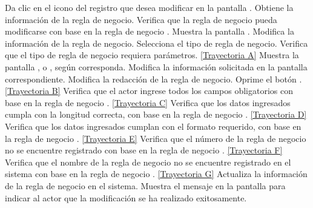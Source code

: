 	\begin{UCtrayectoria}
		\UCpaso[\UCactor] Da clic en el icono \editar del registro que desea modificar en la pantalla .
		\UCpaso[\UCsist] Obtiene la información de la regla de negocio.
		\UCpaso[\UCsist] Verifica que la regla de negocio pueda modificarse con base en la regla de negocio . 
		\UCpaso[\UCsist] Muestra la pantalla .
		\UCpaso[\UCactor] Modifica la información de la regla de negocio. \label{CU8.2-P5}
		\UCpaso[\UCactor] Selecciona el tipo de regla de negocio.
		\UCpaso[\UCsist] Verifica que el tipo de regla de negocio requiera parámetros. \hyperlink{CU8-2:TAA}{[Trayectoria A]}
		\UCpaso[\UCsist] Muestra la pantalla ,  o , según corresponda.
		\UCpaso[\UCactor] Modifica la información solicitada en la pantalla correspondiente.
		\UCpaso[\UCactor] Modifica la redacción de la regla de negocio. \label{CU8.2-P11}
		\UCpaso[\UCactor] Oprime el botón . \hyperlink{CU8-2:TAB}{[Trayectoria B]}
		\UCpaso[\UCsist] Verifica que el actor ingrese todos los campos obligatorios con base en la regla de negocio . \hyperlink{CU8-2:TAC}{[Trayectoria C]}
		\UCpaso[\UCsist] Verifica que los datos ingresados cumpla con la longitud correcta, con base en la regla de negocio . \hyperlink{CU8-2:TAD}{[Trayectoria D]}
		\UCpaso[\UCsist] Verifica que los datos ingresados cumplan con el formato requerido, con base en la regla de negocio . \hyperlink{CU8-2:TAE}{[Trayectoria E]}
		\UCpaso[\UCsist] Verifica que el número de la regla de negocio no se encuentre registrado con base en la regla de negocio . \hyperlink{CU8-2:TAF}{[Trayectoria F]}
		\UCpaso[\UCsist] Verifica que el nombre de la regla de negocio no se encuentre registrado en el sistema con base en la regla de negocio . \hyperlink{CU8-2:TAG}{[Trayectoria G]}
		\UCpaso[\UCsist] Actualiza la información de la regla de negocio en el sistema.
		\UCpaso[\UCsist] Muestra el mensaje  en la pantalla  para indicar al actor que la modificación se ha realizado exitosamente.
	\end{UCtrayectoria}		
	
